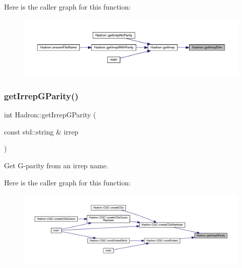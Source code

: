 Here is the caller graph for this function\+:
\nopagebreak
\begin{figure}[H]
\begin{center}
\leavevmode
\includegraphics[width=350pt]{d1/daf/namespaceHadron_a0451202d2f27c90c438c0d23da609c62_icgraph}
\end{center}
\end{figure}
\mbox{\label{namespaceHadron_a951cfb9d3a3b24aaf558d2e22513cec1}} 
\subsubsection{\texorpdfstring{getIrrepGParity()}{getIrrepGParity()}}
{\footnotesize\ttfamily int Hadron\+::get\+Irrep\+G\+Parity (\begin{DoxyParamCaption}\item[{const std\+::string \&}]{irrep }\end{DoxyParamCaption})}



Get G-\/parity from an irrep name. 

Here is the caller graph for this function\+:\nopagebreak
\begin{figure}[H]
\begin{center}
\leavevmode
\includegraphics[width=350pt]{d1/daf/namespaceHadron_a951cfb9d3a3b24aaf558d2e22513cec1_icgraph}
\end{center}
\end{figure}
\mbox{\label{namespaceHadron_a79373fb0ae210931217ae33dc98f5ee9}} 
